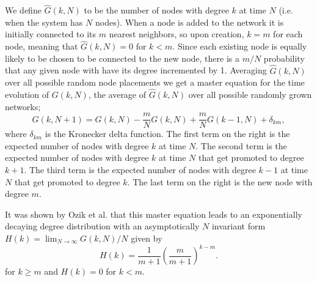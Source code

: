 \documentclass[aps,pre,manuscript,superscriptaddress,amsmath,amssymb,nofootinbib]{revtex4-1}
\begin{document}
We define $\hat{G}(k,N)$ to be the number of nodes with degree $k$ at time $N$ (i.e. when the system has $N$ nodes).
When a node is added to the network it is initially connected to its $m$ nearest neighbors, so upon creation, $k = m$ for each node, meaning that $\hat{G}(k,N) = 0 \text{ for } k < m$.
Since each existing node is equally likely to be chosen to be connected to the new node, there is a $m/N$ probability that any given node with have its degree incremented by 1.
Averaging $\hat{G}(k,N)$ over all possible random node placements we get a master equation for the time evolution of $G(k,N)$, the average of $\hat{G}(k,N)$ over all possible randomly grown networks;
\begin{equation}
G(k,N+1) = G(k,N) - \frac{m}{N}G(k,N) + \frac{m}{N}G(k-1,N) + \delta_{km},
\end{equation}
\noindent where $\delta_{km}$ is the Kronecker delta function.
The first term on the right is the expected number of nodes with degree $k$ at time $N$.
The second term is the expected number of nodes with degree $k$ at time $N$ that get promoted to degree $k+1$.
The third term is the expected number of nodes with degree $k-1$ at time $N$ that get promoted to degree $k$.
The last term on the right is the new node with degree $m$.

It was shown by Ozik et al. \cite{ozik2004} that this master equation leads to an exponentially decaying degree distribution with an asymptotically $N$ invariant form $H(k) = \lim_{N \to \infty} G(k,N)/N$ given by
\begin{equation}\label{degeq}
H(k) = \frac{1}{m+1}\left(\frac{m}{m+1}\right)^{k-m}.
\end{equation}
\noindent for $k \geq m$ and $H(k) = 0$ for $k < m$.
\end{document}
